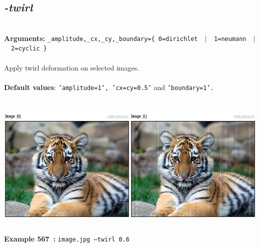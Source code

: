 \documentclass[a4paper,11pt,twoside]{book}
\begin{document}
\subsection{\emph{-twirl} }\vspace*{-0.5em}
~\\\textbf{Arguments: } 
{\small \texttt{\_amplitude,\_cx,\_cy,\_boundary=\{ 0=dirichlet ~$|$~ 1=neumann ~$|$~ 2=cyclic \}}}\\~\\
Apply twirl deformation on selected images.
~\\~\\\textbf{Default values}: {\small \texttt{'amplitude=1', 'cx=cy=0.5'} and \texttt{'boundary=1'.}}
\begin{center}\includegraphics[keepaspectratio=true,height=7cm,width=\textwidth]{img/gmic_def567.jpg}\\
{\footnotesize \textbf{Example 567~:} \texttt{image.jpg --twirl 0.6}}
\end{center}
\end{document}
